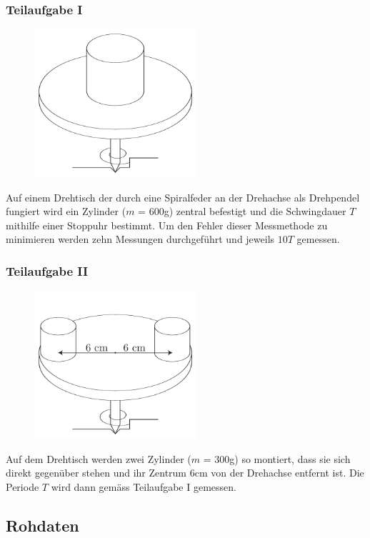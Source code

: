\documentclass[12pt,a4paper]{article}
\begin{document}
\subsubsection*{Teilaufgabe I}
\begin{figure}
\vspace{-50pt}
\centering
\includegraphics[width=6cm]{illustration11.pdf}
\end{figure}
Auf einem Drehtisch der durch eine Spiralfeder an der Drehachse als Drehpendel fungiert wird ein Zylinder ($m$ = 600g) zentral befestigt und die Schwingdauer $T$ mithilfe einer Stopp\-uhr bestimmt. Um den Fehler dieser Messmethode zu minimieren werden zehn Messungen durchgef\"uhrt und jeweils $10T$ gemessen.

\subsubsection*{Teilaufgabe II}
\begin{figure}
\vspace{-50pt}
\centering
\includegraphics[width=6cm]{illustration12.pdf}
\end{figure}
Auf dem Drehtisch werden zwei Zylinder ($m$ = 300g) so montiert, dass sie sich direkt gegen\"uber stehen und ihr Zentrum 6cm von der Drehachse entfernt ist. Die Periode $T$ wird dann gem\"ass Teilaufgabe I gemessen.

\subsection*{Rohdaten}
\end{document}
